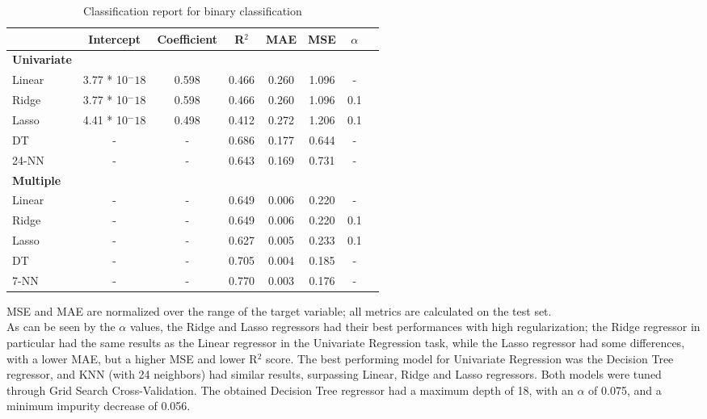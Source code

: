 \begin{table}[H]
    \centering
    \begin{tabular}{lccccccc}
        \toprule
         & \textbf{Intercept} & \textbf{Coefficient} & \textbf{R$^2$} & \textbf{MAE} & \textbf{MSE} & \textbf{$\alpha$} \\
        \midrule
        \textbf{Univariate} \\
        \midrule
        Linear & 3.77 * 10$^-18$ & 0.598 & 0.466 & 0.260 & 1.096 & - \\ %
        Ridge & 3.77 * 10$^-18$ & 0.598 & 0.466 & 0.260 & 1.096 & 0.1 \\ %
        Lasso & 4.41 * 10$^-18$ & 0.498 & 0.412 & 0.272 & 1.206 & 0.1 \\ %
        DT & - & - & 0.686 & 0.177 & 0.644 & - \\
        24-NN & - & - & 0.643 & 0.169 & 0.731 & - \\
        \midrule
        \textbf{Multiple}\\
        \midrule
        Linear & - & - & 0.649 & 0.006 & 0.220 & - \\
        Ridge & - & - & 0.649 & 0.006 & 0.220 & 0.1 \\ %
        Lasso & - & - & 0.627 & 0.005 & 0.233 & 0.1 \\ %
        DT & - & - & 0.705 & 0.004 & 0.185 & - \\
        7-NN & - & - & 0.770 & 0.003 & 0.176 & - \\
        \bottomrule
    \end{tabular}
    \caption{Classification report for binary classification}
    \label{tab:uni_multi_regression_report}
\end{table}

MSE and MAE are normalized over the range of the target variable; all metrics are calculated on
the test set.\\
As can be seen by the $\alpha$ values, the Ridge and Lasso regressors had their best performances
with high regularization; the Ridge regressor in particular had the same results as the Linear regressor
in the Univariate Regression task, while the Lasso regressor had some differences, with a lower MAE,
but a higher MSE and lower R$^2$ score. The best performing model for Univariate Regression was 
the Decision Tree regressor, and KNN (with 24 neighbors) had similar results, surpassing
Linear, Ridge and Lasso regressors. Both models were tuned through Grid Search Cross-Validation.
The obtained Decision Tree regressor had a maximum depth of 18, with an $\alpha$ of 0.075, and a
minimum impurity decrease of 0.056.




